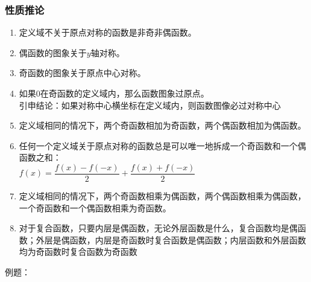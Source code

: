 \subsubsection*{性质推论} 
\begin{enumerate}
    \item 定义域不关于原点对称的函数是非奇非偶函数。
    \item 偶函数的图象关于$y$轴对称。
    \item 奇函数的图象关于原点中心对称。
    \item 如果0在奇函数的定义域内，那么函数图象过原点。\\
    引申结论：如果对称中心横坐标在定义域内，则函数图像必过对称中心
    \item 定义域相同的情况下，两个奇函数相加为奇函数，两个偶函数相加为偶函数。
    \item 任何一个定义域关于原点对称的函数总是可以唯一地拆成一个奇函数和一个偶函数之和：\\
    $f(x)=\dfrac{f(x)-f(-x)}{2}+\dfrac{f(x)+f(-x)}{2}$
    \item 定义域相同的情况下，两个奇函数相乘为偶函数，两个偶函数相乘为偶函数，一个奇函数和一个偶函数相乘为奇函数。  
    \item 对于复合函数，只要内层是偶函数，无论外层函数是什么，复合函数均是偶函数；外层是偶函数，内层是奇函数时复合函数是偶函数；内层函数和外层函数均为奇函数时复合函数为奇函数
\end{enumerate}
例题：

